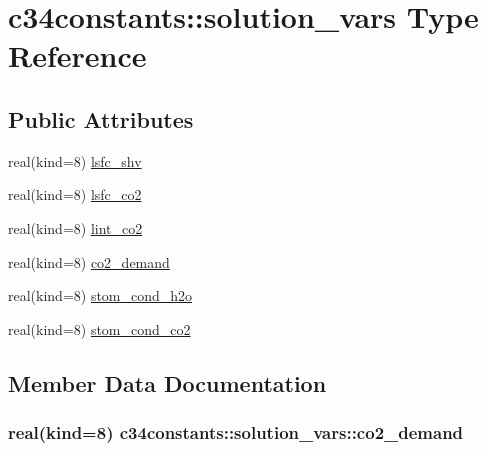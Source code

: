 \hypertarget{structc34constants_1_1solution__vars}{}\section{c34constants\+:\+:solution\+\_\+vars Type Reference}
\label{structc34constants_1_1solution__vars}
\subsection*{Public Attributes}
\begin{DoxyCompactItemize}
\item 
real(kind=8) \hyperlink{structc34constants_1_1solution__vars_a0df579a15ba37cb260c02e5e5006a898}{lsfc\+\_\+shv}
\item 
real(kind=8) \hyperlink{structc34constants_1_1solution__vars_ac883ed09e84e928780493e4964a66a7c}{lsfc\+\_\+co2}
\item 
real(kind=8) \hyperlink{structc34constants_1_1solution__vars_a02f4a98ac3084ca6df1289a9c5d98b5f}{lint\+\_\+co2}
\item 
real(kind=8) \hyperlink{structc34constants_1_1solution__vars_a76ff465202bc6670a65318d765d34a29}{co2\+\_\+demand}
\item 
real(kind=8) \hyperlink{structc34constants_1_1solution__vars_af8670de0f15d89016b814037183ece8e}{stom\+\_\+cond\+\_\+h2o}
\item 
real(kind=8) \hyperlink{structc34constants_1_1solution__vars_a0ff64b64e4fcc1416cb87b47a096d7a1}{stom\+\_\+cond\+\_\+co2}
\end{DoxyCompactItemize}


\subsection{Member Data Documentation}
\hypertarget{structc34constants_1_1solution__vars_a76ff465202bc6670a65318d765d34a29}{}
\subsubsection[{co2\+\_\+demand}]{\setlength{\rightskip}{0pt plus 5cm}real(kind=8) c34constants\+::solution\+\_\+vars\+::co2\+\_\+demand}\label{structc34constants_1_1solution__vars_a76ff465202bc6670a65318d765d34a29}
\hypertarget{structc34constants_1_1solution__vars_a02f4a98ac3084ca6df1289a9c5d98b5f}{}

